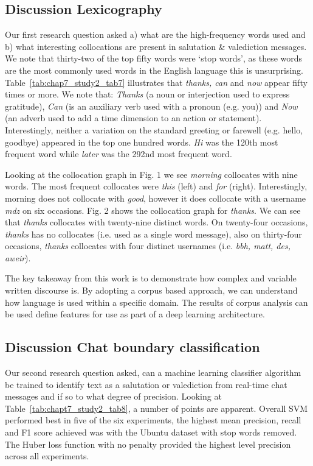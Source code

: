 \subsection{Discussion Lexicography}

Our first research question asked a) what are the high-frequency words used and b) what interesting collocations are present in salutation \& valediction messages. We note that thirty-two of the top fifty words were `stop words', as these words are the most commonly used words in the English language this is unsurprising. Table~\ref{tab:chap7_study2_tab7} illustrates that \textit{thanks, can} and \textit{now} appear fifty times or more. We note that: \textit{Thanks} (a noun or interjection used to express gratitude), \textit{Can} (is an auxiliary verb used with a pronoun (e.g. you)) and \textit{Now} (an adverb used to add a time dimension to an action or statement). Interestingly, neither a variation on the standard greeting or farewell (e.g. hello, goodbye) appeared in the top one hundred words. \textit{Hi} was the 120th most frequent word while \textit{later} was the 292nd most frequent word.

Looking at the collocation graph in Fig. 1 we see \textit{morning} collocates with nine words. The most frequent collocates were \textit{this} (left) and  \textit{for} (right). Interestingly, morning does not collocate with \textit{good}, however it does collocate with a username \textit{mdz} on six occasions. Fig. 2 shows the collocation graph for \textit{thanks}. We can see that \textit{thanks} collocates with twenty-nine distinct words. On twenty-four occasions, \textit{thanks} has no collocates (i.e. used as a single word message), also on thirty-four occasions, \textit{thanks} collocates with four distinct usernames (i.e. \textit{bbh, matt, des, aweir}).

The key takeaway from this work is to demonstrate how complex and variable written discourse is. By adopting a corpus based approach, we can understand how language is used within a specific domain. The results of corpus analysis can be used define features for use as part of a deep learning architecture.

\subsection{Discussion Chat boundary classification}

Our second research question asked, can a machine learning classifier algorithm be trained to identify text as a salutation or valediction from real-time chat messages and if so to what degree of precision. Looking at Table~\ref{tab:chapt7_study2_tab8}, a number of points are apparent. Overall SVM performed best in five of the six experiments, the highest mean precision, recall and F1 score achieved was with the Ubuntu dataset with stop words removed. The Huber loss function with no penalty provided the highest level precision across all experiments. 

